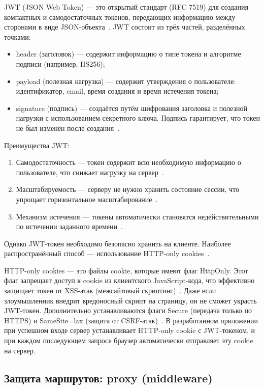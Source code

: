 JWT (JSON Web Token) — это открытый стандарт (RFC 7519) для создания компактных и самодостаточных токенов, передающих информацию между сторонами в виде JSON-объекта~\cite{jwtIntro}. JWT состоит из трёх частей, разделённых точками:
\begin{itemize}
    \item header (заголовок) — содержит информацию о типе токена и алгоритме подписи (например, HS256);
    \item payload (полезная нагрузка) — содержит утверждения о пользователе: идентификатор, email, время создания и время истечения токена;
    \item signature (подпись) — создаётся путём шифрования заголовка и полезной нагрузки с использованием секретного ключа. Подпись гарантирует, что токен не был изменён после создания~\cite{jwtIntro}.
\end{itemize}

Преимущества JWT:
\begin{enumerate}
    \item Самодостаточность — токен содержит всю необходимую информацию о пользователе, что снижает нагрузку на сервер~\cite{jwtIntro}.
    \item Масштабируемость — серверу не нужно хранить состояние сессии, что упрощает горизонтальное масштабирование~\cite{bookJWT}.
    \item Механизм истечения — токены автоматически становятся недействительными по истечении заданного времени~\cite{jwtIntro}.
\end{enumerate}

Однако JWT-токен необходимо безопасно хранить на клиенте. Наиболее распространённый способ — использование HTTP-only cookies~\cite{cookieSecurity}.

HTTP-only cookies — это файлы cookie, которые имеют флаг HttpOnly. Этот флаг запрещает доступ к cookie из клиентского JavaScript-кода, что эффективно защищает токен от XSS-атак (межсайтовый скриптинг)~\cite{owaspXSS}. Даже если злоумышленник внедрит вредоносный скрипт на страницу, он не сможет украсть JWT-токен. Дополнительно устанавливаются флаги Secure (передача только по HTTPS) и SameSite=lax (защита от CSRF-атак)~\cite{cookieSecurity}. В разработанном приложении при успешном входе сервер устанавливает HTTP-only cookie с JWT-токеном, и при каждом последующем запросе браузер автоматически отправляет эту cookie на сервер.

\subsection{Защита маршрутов: proxy (middleware)}

